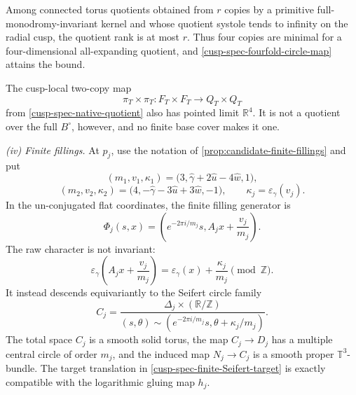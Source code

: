 \begin{theorem}
Among connected torus quotients obtained from \(r\) copies by a primitive
full-monodromy-invariant kernel and whose quotient systole tends to infinity
on the radial cusp, the quotient rank is at most \(r\).  Thus four copies
are minimal for a four-dimensional all-expanding quotient, and
\cref{cusp-spec-fourfold-circle-map} attains the bound.

The cusp-local two-copy map
\begin{equation}
 \pi_T\times\pi_T:F_T\times F_T\longrightarrow Q_T\times Q_T
 \label{cusp-spec-doubled-local-quotient}
\end{equation}
from \cref{cusp-spec-native-quotient} also has pointed limit
\(\mathbb R^4\).  It is not a quotient over the full \(B^\circ\), however,
and no finite base cover makes it one.

\smallskip
\noindent
\emph{(iv) Finite fillings.}
At \(p_j\), use the notation of
\cref{prop:candidate-finite-fillings} and put
\[
 (m_1,v_1,\kappa_1)
 =\bigl(3,\widehat\gamma+2\widehat u-4\widehat w,1\bigr),
\]
\[
 (m_2,v_2,\kappa_2)
 =\bigl(4,-\widehat\gamma-3\widehat u+3\widehat w,-1\bigr),\qquad
 \kappa_j=\varepsilon_\gamma(v_j).
\tag{G.2}
\]
In the un-conjugated flat coordinates, the finite filling generator is
\begin{equation}
 \Phi_j(s,x)=
 \left(e^{-2\pi i/m_j}s,A_jx+\frac{v_j}{m_j}\right).
 \label{cusp-spec-finite-affine-action}
\end{equation}
The raw character is not invariant:
\begin{equation}
 \varepsilon_\gamma\left(A_jx+\frac{v_j}{m_j}\right)
 =\varepsilon_\gamma(x)+\frac{\kappa_j}{m_j}\pmod{\mathbb Z}.
 \label{cusp-spec-finite-character-shift}
\end{equation}
It instead descends equivariantly to the Seifert circle family
\begin{equation}
 C_j=
 \frac{\Delta_j\times(\mathbb R/\mathbb Z)}
 {(s,\theta)\sim
  (e^{-2\pi i/m_j}s,\theta+\kappa_j/m_j)}.
 \label{cusp-spec-finite-Seifert-target}
\end{equation}
The total space \(C_j\) is a smooth solid torus, the map
\(C_j\to D_j\) has a multiple central circle of order \(m_j\), and the
induced map \(N_j\to C_j\) is a smooth proper \(\mathbb T^3\)-bundle.
The target translation in \cref{cusp-spec-finite-Seifert-target} is
exactly compatible with the logarithmic gluing map \(h_j\).


\end{theorem}
